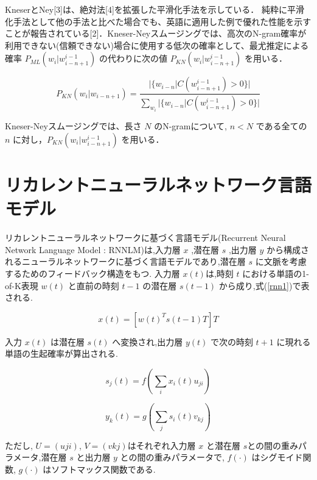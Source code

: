 
KneserとNey[3]は、絶対法[4]を拡張した平滑化手法を示している．
純粋に平滑化手法として他の手法と比べた場合でも、英語に適用した例で優れた性能を示すことが報告されている[2]．Kneser-Neyスムージングでは、高次のN-gram確率が利用できない(信頼できない)場合に使用する低次の確率として、最尤推定による確率 $P_{ML} (w_i|w_{i-n+1}^{i-1})$ の代わりに次の値 $P_{KN} (w_i|w_{i-n+1}^{i-1})$ を用いる．

\begin{equation}
		P_{KN} (w_i|w_{i-n+1}) = \frac{|\{w_{i-n}|C(w_{i-n+1}^{i-1}) > 0\}|}{\sum_{w_i} |\{w_{i-n}|C(w_{i-n+1}^{i-1}) > 0\}|} 
    \label{ngram_smoosing2}
\end{equation}

Kneser-Neyスムージングでは、長さ $N$ のN-gramについて, $n  <  N$ である全ての $n$ に対し，$P_{KN} (w_i|w_{i-n+1}^{i-1})$ を用いる．

\section{リカレントニューラルネットワーク言語モデル}
リカレントニューラルネットワークに基づく言語モデル(Recurrent Neural Network Language Model : RNNLM)は,入力層 $x$ ,潜在層 $s$ ,出力層 $y$ から構成されるニューラルネットワークに基づく言語モデルであり,潜在層 $s$ に文脈を考慮するためのフィードバック構造をもつ. 入力層 $x(t)$は,時刻 $t$ における単語の1-of-K表現 $w(t)$ と直前の時刻 $t−1$
の潜在層 $s(t−1)$ から成り,式(\ref{rnn1})で表される.

\begin{equation}
		x(t) = [w(t)^T s(t-1)T]T
    \label{rnn1}
\end{equation}

入力 $x(t)$ は潜在層 $s(t)$ へ変換され,出力層 $y(t)$ で次の時刻 $t+1$ に現れる単語の生起確率が算出される.

\begin{equation}
		s_j(t) = f(\sum_i x_i(t) u_{ji})
    \label{rnn2}
\end{equation}

\begin{equation}
		y_k(t) = g(\sum_j s_i(t) v_{kj})
    \label{rnn3}
\end{equation}

ただし, $U=(uji)$, $V=(vkj)$はそれぞれ入力層 $x$ と潜在層 $s$との間の重みパラメータ,潜在層 $s$
と出力層 $y$ との間の重みパラメータで, $f(·)$ はシグモイド関数, $g(·)$ はソフトマックス関数である.


